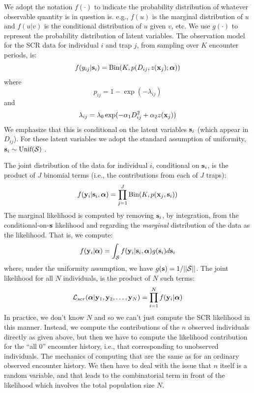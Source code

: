\documentclass[12pt]{article}
\begin{document}
We adopt the notation $f(\cdot)$ to indicate the probability
distribution of whatever observable quantity is in question is. e.g., $f(u)$ is
the marginal distribution of $u$ and $f(u|v)$ is the conditional
distribution of $u$ given $v$, etc. We use $g(\cdot)$ to represent the
probability distribution of latent variables.
The observation model for the SCR data for individual $i$ and trap $j$,
from sampling over $K$ encounter periods, is:
\begin{equation}
f(y_{ij}| {\bf s}_{i}) = \mbox{Bin}(K, p(D_{ij}, z({\bf x}_{j}); {\bm \alpha}))
\label{rsf.mle.eq.cond-on-s}
\end{equation}
where
\[
 p_{ij} = 1-\exp(- \lambda_{ij} )
\]
and
\[
 \lambda_{ij} = \lambda_{0} \exp(- \alpha_{1} D_{ij}^{2} + \alpha_{2}
 z({\bf x}_{j}) )
\]
We emphasize that this is conditional on the latent variables ${\bf
  s}_{i}$ (which appear in $D_{ij}$). For these latent variables we
adopt the standard assumption of uniformity, ${\bf s}_{i} \sim
\mbox{Unif}({\cal S})$ \citep{royle_young:2008}.

The joint distribution of the data for
individual $i$, conditional on ${\bf s}_{i}$, is the product of $J$
binomial terms (i.e., the contributions from each of $J$ traps):
\[
  f({\bf y}_{i} | {\bf s}_{i} , {\bm \alpha}) =
  \prod_{j=1}^{J} \mbox{Bin}(K, p({\bf x}_{j},{\bf s}_{i}) )
\]
The marginal likelihood \citep{borchers_efford:2008} is
computed by removing ${\bf s}_{i}$, by integration, from the
conditional-on-${\bf s}$ likelihood and regarding the {\it marginal}
distribution of the data as the likelihood. That is, we compute:
\[
  f({\bf y}_{i}|{\bm \alpha}) =
\int_{{\cal S}}  f( {\bf y}_{i} |{\bf s}_{i},{\bm \alpha}) g({\bf s}_{i}) d{\bf s}_{i}
\]
{\flushleft where}, under the uniformity assumption, we have
$g({\bf s}) = 1/||{\cal S}||$.
The joint likelihood for all $N$ individuals,
is the product of $N$ such terms:
\[
{\cal L}_{scr}({\bm \alpha} | {\bf y}_{1},{\bf y}_{2},\ldots, {\bf y}_{N}) = \prod_{i=1}^{N}
f({\bf y}_{i}|{\bm \alpha})
\]
In practice, we don't know $N$ and so we can't just compute the
SCR likelihood in this manner. Instead,
we compute the contributions of the
$n$ observed individuals directly as given above,
but then we have to compute the likelihood
contribution for the ``all 0'' encounter history, i.e., that
corresponding to unobserved individuals. The mechanics of computing
that are the same as for an ordinary observed encounter history. We
then have to deal with the issue that $n$ itself is a random variable,
and that leads to the combinatorial term in front of the likelihood
which involves the total population size $N$.
\end{document}
